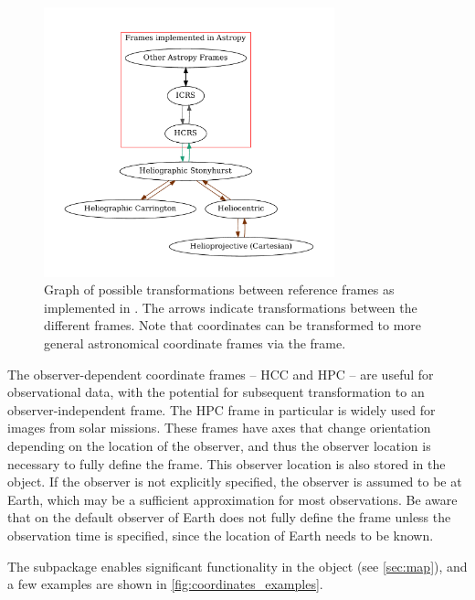 \begin{figure}
    \centering
    \includegraphics[width=0.75\textwidth]{figures/sunpy_frames.pdf}
    \caption{Graph of possible transformations between reference frames as implemented in .
    The arrows indicate transformations between the different frames.
    Note that coordinates can be transformed to more general astronomical coordinate frames via the \hgs frame.}
    \label{fig:transform_graph}
\end{figure}

The observer-dependent coordinate frames -- HCC and HPC -- are useful for observational data, with the potential for subsequent transformation to an observer-independent frame.
The HPC frame in particular is widely used for images from solar missions.
These frames have axes that change orientation depending on the location of the observer, and thus the observer location is necessary to fully define the frame.
This observer location is also stored in the  object.
If the observer is not explicitly specified, the observer is assumed to be at Earth, which may be a sufficient approximation for most observations.
Be aware that on the default observer of Earth does not fully define the frame unless the observation time is specified, since the location of Earth needs to be known.

The  subpackage enables significant functionality in the  object (see \autoref{sec:map}), and a few examples are shown in \autoref{fig:coordinates_examples}.


